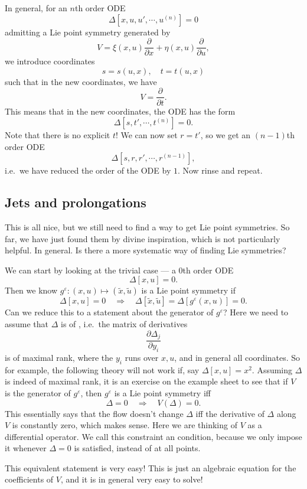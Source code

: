 \documentclass[a4paper]{article}
\begin{document}
In general, for an $n$th order ODE
\[
  \Delta[x, u, u', \cdots, u^{(n)}] = 0
\]
admitting a Lie point symmetry generated by
\[
  V= \xi(x, u) \frac{\partial}{\partial x} + \eta(x, u) \frac{\partial}{\partial u},
\]
we introduce coordinates
\[
  s = s(u, x),\quad t = t(u, x)
\]
such that in the new coordinates, we have
\[
  V = \frac{\partial}{\partial t}.
\]
This means that in the new coordinates, the ODE has the form
\[
  \Delta[s, t', \cdots, t^{(n)} ] = 0.
\]
Note that there is no explicit $t$! We can now set $r = t'$, so we get an $(n - 1)$th order ODE
\[
  \Delta[s, r, r', \cdots, r^{(n - 1)}],
\]
i.e.\ we have reduced the order of the ODE by $1$. Now rinse and repeat.

\subsection{Jets and prolongations}
This is all nice, but we still need to find a way to get Lie point symmetries. So far, we have just found them by divine inspiration, which is not particularly helpful. In general. Is there a more systematic way of finding Lie symmetries?

We can start by looking at the trivial case --- a $0$th order ODE
\[
  \Delta[x, u] = 0.
\]
Then we know $g^\varepsilon: (x, u) \mapsto (\tilde{x}, \tilde{u})$ is a Lie point symmetry if
\[
  \Delta[x, u] = 0\quad\Longrightarrow\quad \Delta[\tilde{x}, \tilde{u}] = \Delta[g^\varepsilon(x, u)] = 0.
\]
Can we reduce this to a statement about the generator of $g^\varepsilon$? Here we need to assume that $\Delta$ is of , i.e.\ the matrix of derivatives
\[
  \frac{\partial \Delta_j}{\partial y_i}
\]
is of maximal rank, where the $y_i$ runs over $x, u$, and in general all coordinates. So for example, the following theory will not work if, say $\Delta[x, u] = x^2$. Assuming $\Delta$ is indeed of maximal rank, it is an exercise on the example sheet to see that if $V$ is the generator of $g^\varepsilon$, then $g^\varepsilon$ is a Lie point symmetry iff
\[
  \Delta = 0 \quad\Longrightarrow\quad V(\Delta) = 0.
\]
This essentially says that the flow doesn't change $\Delta$ iff the derivative of $\Delta$ along $V$ is constantly zero, which makes sense. Here we are thinking of $V$ as a differential operator. We call this constraint an  condition, because we only impose it whenever $\Delta = 0$ is satisfied, instead of at all points.

This equivalent statement is very easy! This is just an algebraic equation for the coefficients of $V$, and it is in general very easy to solve!
\end{document}
